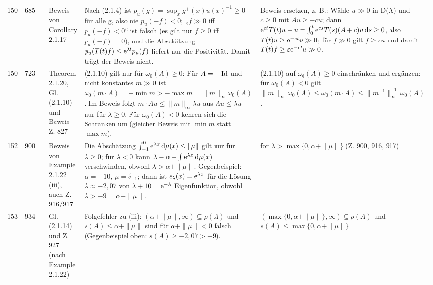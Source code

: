\documentclass[10pt]{article}
\begin{document}
\begin{longtable}{@{}rrc>{\RaggedRight\arraybackslash}p{3.0cm}>{\RaggedRight\arraybackslash}p{11.4cm}>{\RaggedRight\arraybackslash}p{7.4cm}@{}}
150 & 685 & \sichA{} & Beweis von Corollary 2.1.17 & Nach (2.1.4) ist $p_{u}(g) = \sup_{x} g^{+}(x)u(x)^{-1} \geq 0$ für alle g, also nie $p_{u}(-f) < 0$; „$f \ensuremath{\gg} 0$ iff $p_{u}(-f) < 0$“ ist falsch (es gilt nur $f \ensuremath{\geq} 0$ iff $p_{u}(-f) = 0$), und die Abschätzung $p_{u}(T(t)f) \leq \eu^{\lambda t}p_{u}(f)$ liefert nur die Positivität. Damit trägt der Beweis nicht. & Beweis ersetzen, z. B.: Wähle $u \gg 0$ in D(A) und $c \geq 0$ mit $Au \geq -cu$; dann $\eu^{ct}T(t)u - u = \int_{0}^{t}\eu^{cs}T(s)(A+c)u\ds \geq 0$, also $T(t)u \geq \eu^{-ct}u \gg 0$; für $f \gg 0$ gilt $f \geq \epsilon u$ und damit $T(t)f \geq \epsilon\eu^{-ct}u \gg 0$. \\[2pt]
150 & 723 & \sichA{} & Theorem 2.1.20, Gl. (2.1.10) und Beweis Z. 827 & (2.1.10) gilt nur für $\omega_{0}(A) \geq 0$: Für $A = -\operatorname{Id}$ und nicht konstantes $m \ensuremath{\gg} 0$ ist $\omega_{0}(m \cdot A) = -\min m > -\max m = \|m\|_{\infty}\omega_{0}(A)$. Im Beweis folgt $m \cdot Au \leq \|m\|_{\infty}\lambda u$ aus $Au \leq \lambda u$ nur für $\ensuremath{\lambda} \ensuremath{\geq} 0$. Für $\omega_{0}(A) < 0$ kehren sich die Schranken um (gleicher Beweis mit $\min m$ statt $\max m$). & (2.1.10) auf $\omega_{0}(A) \geq 0$ einschränken und ergänzen: für $\omega_{0}(A) < 0$ gilt $\|m\|_{\infty}\,\omega_{0}(A) \leq \omega_{0}(m \cdot A) \leq \|m^{-1}\|_{\infty}^{-1}\,\omega_{0}(A)$. \\[2pt]
152 & 900 & \sichA{} & Beweis von Example 2.1.22 (iii), auch Z. 916/917 & Die Abschätzung $\int_{-1}^{0}\eu^{\lambda x}\diff{\mu(x)} \leq \|\mu\|$ gilt nur für $\ensuremath{\lambda} \ensuremath{\geq} 0$; für $\ensuremath{\lambda} < 0$ kann $\lambda - \alpha - \int\mathrm{e}^{\lambda x}\mathop{}\!\mathrm{d}{\mu(x)}$ verschwinden, obwohl $\lambda > \alpha + \|\mu\|$. Gegenbeispiel: $\ensuremath{\alpha} = \ensuremath{-}10$, $\mu = \delta_{-1}$; dann ist $e_{\lambda}(x) = \mathrm{e}^{\lambda x}$ für die Lösung $\ensuremath{\lambda} \ensuremath{\approx} \ensuremath{-}2,07$ von $\lambda + 10 = \mathrm{e}^{-\lambda}$ Eigenfunktion, obwohl $\ensuremath{\lambda} > \ensuremath{-}9 = \ensuremath{\alpha} + \ensuremath{\|}\ensuremath{\mu}\ensuremath{\|}$. & {for $\lambda > \max\{0, \alpha + \|\mu\|\}$} (Z. 900, 916, 917) \\[2pt]
153 & 934 & \sichA{} & Gl. (2.1.14) und Z. 927 (nach Example 2.1.22) & Folgefehler zu (iii): $(\alpha + \|\mu\|,\infty) \subseteq \rho(A)$ und $s(A) \leq \alpha + \|\mu\|$ sind für $\ensuremath{\alpha} + \ensuremath{\|}\ensuremath{\mu}\ensuremath{\|} < 0$ falsch (Gegenbeispiel oben: $s(A) \ensuremath{\geq} \ensuremath{-}2,07 > \ensuremath{-}9$). & $(\max\{0,\alpha + \|\mu\|\}, \infty) \subseteq \rho(A)$ und $s(A) \leq \max\{0, \alpha + \|\mu\|\}$ \\[2pt]

\end{longtable}
\end{document}
